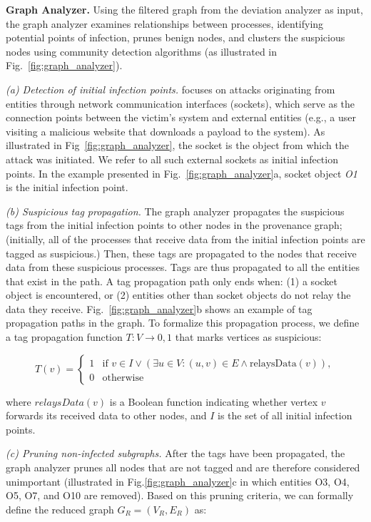 \noindent\textbf{Graph Analyzer. }
Using the filtered graph from the deviation analyzer as input, the graph analyzer examines relationships between processes, identifying potential points of infection, prunes benign nodes, and clusters the suspicious nodes using community detection algorithms (as illustrated in Fig.~\ref{fig:graph_analyzer}).

\noindent\textit{(a) Detection of initial infection points.} 
\method focuses on attacks originating from entities through network communication interfaces (sockets), which serve as the connection points between the victim's system and external entities (e.g., a user visiting a malicious website that downloads a payload to the system).
As illustrated in Fig~\ref{fig:graph_analyzer}, the socket is the object from which the attack was initiated. 
We refer to all such external sockets as initial infection points. 
In the example presented in Fig.~\ref{fig:graph_analyzer}a, socket object \textit{O1} is the initial infection point.

\noindent\textit{(b) Suspicious tag propagation.} The graph analyzer propagates the suspicious tags from the initial infection points to other nodes in the provenance graph; (initially, all of the processes that receive data from the initial infection points are tagged as suspicious.) 
Then, these tags are propagated to the nodes that receive data from these suspicious processes. 
Tags are thus propagated to all the entities that exist in the path. 
A tag propagation path only ends when: (1) a socket object is encountered, or (2) entities other than socket objects do not relay the data they receive.
Fig.~\ref{fig:graph_analyzer}b shows an example of tag propagation paths in the graph.
To formalize this propagation process, we define a tag propagation function $T: V \rightarrow {0,1}$ that marks vertices as suspicious:

\begin{equation}
T(v) =
\begin{cases}
1 & \text{if } v \in I \lor \left(\exists u \in V : (u,v) \in E \land \text{relaysData}(v)\right), \\
0 & \text{otherwise}
\end{cases}
\end{equation}

where $relaysData(v)$ is a Boolean function indicating whether vertex $v$ forwards its received data to other nodes, and $I$ is the set of all initial infection points.

\noindent\textit{(c) Pruning non-infected subgraphs.} After the tags have been propagated, the graph analyzer prunes all nodes that are not tagged and are therefore considered unimportant (illustrated in Fig.\ref{fig:graph_analyzer}c in which entities O3, O4, O5, O7, and O10 are removed).
Based on this pruning criteria, we can formally define the reduced graph $G_R = (V_R, E_R)$ as:

